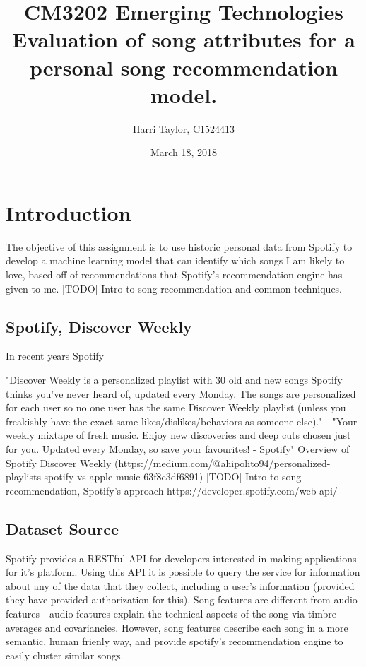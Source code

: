 \documentclass{article}
\title{
	CM3202 Emerging Technologies\\
	\large Evaluation of song attributes for a personal song recommendation model.
	}
\author{Harri Taylor, C1524413}
\date{March 18, 2018}
\begin{document}
	\maketitle
	\newpage
	
	\section{Introduction}
	The objective of this assignment is to use historic personal data from Spotify to develop a machine learning model that can identify which songs I am likely to love, based off of recommendations that Spotify's recommendation engine has given to me. [TODO] Intro to song recommendation and common techniques.
	
		\subsection{Spotify, Discover Weekly}
        In recent years Spotify 

        "Discover Weekly is a personalized playlist with 30 old and new songs Spotify thinks you’ve never heard of, updated every Monday. The songs are personalized for each user so no one user has the same Discover Weekly playlist (unless you freakishly have the exact same likes/dislikes/behaviors as someone else)." - "Your weekly mixtape of fresh music. Enjoy new discoveries and deep cuts chosen just for you. Updated every Monday, so save your favourites! - Spotify"
        Overview of Spotify Discover Weekly (https://medium.com/@ahipolito94/personalized-playlists-spotify-vs-apple-music-63f8c3df6891)
        [TODO] Intro to song recommendation, Spotify's approach https://developer.spotify.com/web-api/
        \subsection{Dataset Source}		
        Spotify provides a RESTful API for developers interested in making applications for it's platform. Using this API it is possible to query the service for information about any of the data that they collect, including a user's information (provided they have provided authorization for this).  Song features are different from audio features - audio features explain the technical aspects of the song via timbre averages and covariancies. However, song features describe each song in a more semantic, human frienly way, and provide spotify's recommendation engine to easily cluster similar songs.
\end{document}
